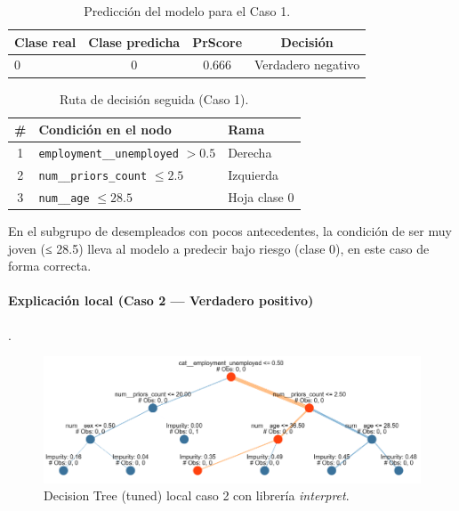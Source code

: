 \begin{table}[h!]
\centering
\caption{Predicción del modelo para el Caso 1.}
\label{tab:local-pred-caso1}
\small
\begin{tabular}{@{}lccc@{}}
\toprule
\textbf{Clase real} & \textbf{Clase predicha} & \textbf{PrScore} & \textbf{Decisión} \\
\midrule
0 & 0 & 0.666 & Verdadero negativo \\
\bottomrule
\end{tabular}
\end{table}

\begin{table}[h!]
\centering
\caption{Ruta de decisión seguida (Caso 1).}
\label{tab:local-path-caso1}
\small
\begin{tabular}{@{}cll@{}}
\toprule
\# & \textbf{Condición en el nodo} & \textbf{Rama} \\
\midrule
1 & \texttt{employment\_\_unemployed} \(> 0.5\) & Derecha \\
2 & \texttt{num\_\_priors\_count} \(\le 2.5\)   & Izquierda \\
3 & \texttt{num\_\_age} \(\le 28.5\)            & Hoja clase 0 \\
\bottomrule
\end{tabular}
\end{table}

En el subgrupo de desempleados con pocos antecedentes, la condición de ser muy joven (≤ 28.5) lleva al modelo a predecir bajo riesgo (clase 0), en este caso de forma correcta.

\paragraph{Explicación local (Caso 2 — Verdadero positivo)}.

\begin{figure}[h!]
  \centering
  \includegraphics[width=0.92\linewidth]{figures/decision_tree_tunned_depth_local2.png}
  \caption{Decision Tree (tuned) local caso 2 con librería \textit{interpret}.}
  \label{fig:tree-tuned_local2}
\end{figure}

